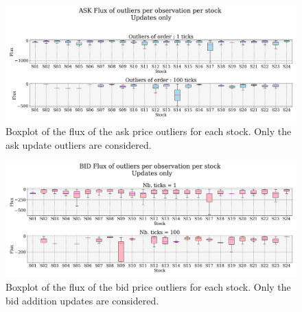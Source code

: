 \documentclass[switch, 11pt]{article}
\begin{document}
\begin{figure}[H]
    \centering
    \includegraphics[width=\columnwidth]{figures/boxplot_flux_outliers_ASK_UPDATE.png}
    \caption{Boxplot of the flux of the ask price outliers for each stock. Only the ask update outliers are considered.}
    \label{fig:flux_ask_update}
\end{figure}

\begin{figure}[H]
    \centering
    \includegraphics[width=\columnwidth]{figures/boxplot_flux_outliers_BID_UPDATE.png}
    \caption{Boxplot of the flux of the bid price outliers for each stock. Only the bid addition updates are considered.}
    \label{fig:flux_bid_update}
\end{figure}
\end{document}
